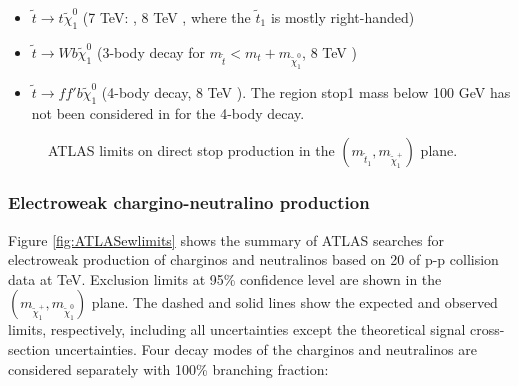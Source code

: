 \begin{itemize}
\item $\tilde{t} \rightarrow t \tilde{\chi}^0_1$ (7 TeV: \cite{atlas:stoplim_1} \cite{atlas:stoplim_2} \cite{atlas:stoplim_3}, 8 TeV \cite{atlas:stoplim_4} \cite{atlas:stoplim_5} \cite{atlas:stoplim_6}, where the $\tilde{t}_1$ is mostly right-handed)


\item $\tilde{t} \rightarrow W b  \tilde{\chi}^0_1$ (3-body decay for $m_{\tilde{t}} < m_t + m_{\tilde{\chi}^0_1} $, 8 TeV \cite{atlas:stoplim_4}\cite{atlas:stoplim_6}) 

\item  $\tilde{t} \rightarrow f f' b  \tilde{\chi}^0_1$ (4-body decay, 8 TeV \cite{atlas:stoplim_4}\cite{atlas:stoplim_7}). The region stop1 mass below 100 GeV has not been considered in \cite{atlas:stoplim_4} for the 4-body decay. 

\end{itemize}

\begin{figure}[htbp]
\begin{center}
\end{center}
\caption[ATLAS limits on direct stop production]{ATLAS limits on direct stop production in the $\left( m_{\tilde{t}_1}, m_{\tilde{\chi}^+_1} \right)$ plane.}
\label{fig:ATLASstoplimits}
\end{figure}



\subsubsection{Electroweak chargino-neutralino production}

Figure \ref{fig:ATLASewlimits} shows the summary of ATLAS searches for electroweak production of charginos and neutralinos based on 20 \ifb of p-p collision data at \cmotto TeV. Exclusion limits at 95\% confidence level are shown in the $\left( m_{\tilde{\chi}^+_1}, m_{\tilde{\chi}^0_1}  \right)$ plane. The dashed and solid lines show the expected and observed limits, respectively, including all uncertainties except the theoretical signal cross-section uncertainties. Four decay modes of the charginos and neutralinos are considered separately with 100\% branching fraction: 

